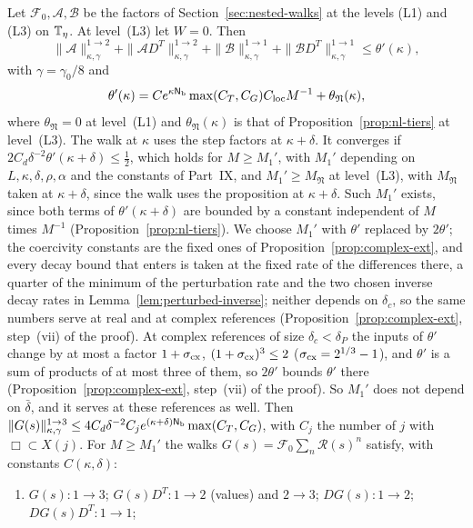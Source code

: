 \begin{theorem}\label{thm:tier-walk}
Let $\mathcal F_0,\mathcal A,\mathcal B$ be the factors of Section~\ref{sec:nested-walks} at the levels (L1) and (L3) on $\mathbb T_\eta$. At level~(L3) let $W=0$. Then
\[
\|\mathcal A\|^{1\to2}_{\kappa,\gamma}+\|\mathcal AD^T\|^{1\to2}_{\kappa,\gamma}+\|\mathcal B\|^{1\to1}_{\kappa,\gamma}+\|\mathcal BD^T\|^{1\to1}_{\kappa,\gamma}\le\theta'(\kappa),
\]
with $\gamma=\gamma_0/8$ and
\[
\theta'(\kappa)=Ce^{\kappa\mathsf N_{\rm b}}\max(C_T,C_G)C_{\rm loc}M^{-1}+\theta_{\mathfrak N}(\kappa),
\]
where $\theta_{\mathfrak N}=0$ at level~(L1) and $\theta_{\mathfrak N}(\kappa)$ is that of Proposition~\ref{prop:nl-tiers} at level~(L3). The walk at $\kappa$ uses the step factors at $\kappa+\delta$. It converges if $2C_d\delta^{-2}\theta'(\kappa+\delta)\le\frac12$, which holds for $M\ge M_1'$, with $M_1'$ depending on $L,\kappa,\delta,\rho,\alpha$ and the constants of Part~IX, and $M_1'\ge M_{\mathfrak N}$ at level~(L3), with $M_{\mathfrak N}$ taken at $\kappa+\delta$, since the walk uses the proposition at $\kappa+\delta$. Such $M_1'$ exists, since both terms of $\theta'(\kappa+\delta)$ are bounded by a constant independent of $M$ times $M^{-1}$ (Proposition~\ref{prop:nl-tiers}). We choose $M_1'$ with $\theta'$ replaced by $2\theta'$; the coercivity constants are the fixed ones of Proposition~\ref{prop:complex-ext}, and every decay bound that enters is taken at the fixed rate of the differences there, a quarter of the minimum of the perturbation rate and the two chosen inverse decay rates in Lemma~\ref{lem:perturbed-inverse}; neither depends on $\delta_c$, so the same numbers serve at real and at complex references (Proposition~\ref{prop:complex-ext}, step~(vii) of the proof). At complex references of size $\delta_c<\delta_P$ the inputs of $\theta'$ change by at most a factor $1+\sigma_{\rm cx}$, $(1+\sigma_{\rm cx})^3\le2$ ($\sigma_{\rm cx}=2^{1/3}-1$), and $\theta'$ is a sum of products of at most three of them, so $2\theta'$ bounds $\theta'$ there (Proposition~\ref{prop:complex-ext}, step~(vii) of the proof). So $M_1'$ does not depend on $\bar\delta$, and it serves at these references as well. Then $\|G(s)\|^{1\to3}_{\kappa,\gamma}\le4C_d\delta^{-2}C_je^{(\kappa+\delta)\mathsf N_{\rm b}}\max(C_T,C_G)$, with $C_j$ the number of $j$ with $\Box\subset X(j)$. For $M\ge M_1'$ the walks $G(s)=\mathcal F_0\sum_n\mathcal R(s)^n$ satisfy, with constants $C(\kappa,\delta)$:
\begin{enumerate}[label=(\alph*)]
\item $G(s)\colon1\to3$; $G(s)D^T\colon1\to2$ (values) and $2\to3$; $DG(s)\colon1\to2$; $DG(s)D^T\colon1\to1$;

\end{enumerate}
\end{theorem}
